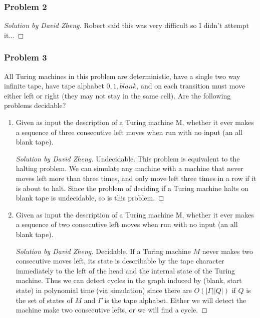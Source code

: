 \documentclass{article}
\newenvironment{solution}[1]{\begin{proof}[Solution by #1]}{\end{proof}}
\begin{document}
\subsubsection{Problem 2}

\begin{solution}{David Zheng}
Robert said this was very difficult so I didn't attempt it...
\end{solution}

\subsubsection{Problem 3}
All Turing machines in this problem are deterministic, have a single two way
infinite tape, have tape alphabet ${0,1,blank}$, and on each transition must move either left
or right (they may not stay in the same cell). Are the following problems decidable?
\begin{enumerate}
    \item 
     Given as input the description of a Turing machine M, whether it ever makes a sequence of three consecutive left moves when run with no input (an all blank tape).
    \begin{solution}{David Zheng}
    Undecidable. This problem is equivalent to the halting problem. We can simulate any machine with a machine that never moves left more than three times, and only move left three times in a row if it is about to halt. Since the problem of deciding if a Turing machine halts on blank tape is undecidable, so is this problem.
    \end{solution}
    \item 
    Given as input the description of a Turing machine M, whether it ever makes a sequence of two consecutive left moves when run with no input (an all blank tape).
    \begin{solution}{David Zheng}
    Decidable. If a Turing machine $M$ never makes two consecutive moves left, its state is describable by the tape character immediately to the left of the head and the internal state of the Turing machine. Thus we can detect cycles in the graph induced by (blank, start state) in polynomial time (via simulation) since there are $O(|\Gamma||Q|)$ if $Q$ is the set of states of $M$ and $\Gamma$ is the tape alphabet. Either we will detect the machine make two consecutive lefts, or we will find a cycle.
    \end{solution}
\end{enumerate}
\end{document}
